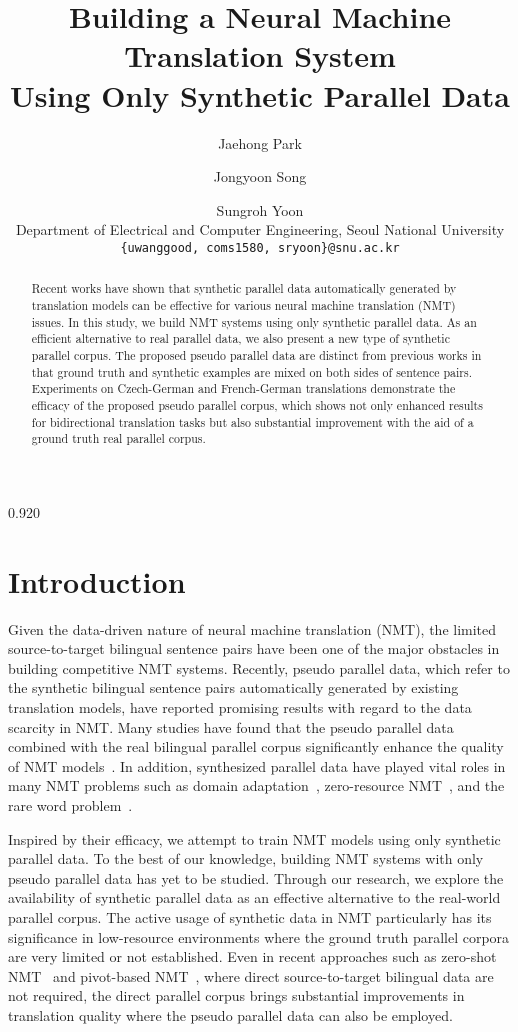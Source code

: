 \documentclass[11pt,letterpaper]{article}
\title{Building a Neural Machine Translation System\\Using Only Synthetic Parallel Data}
\author{Jaehong Park \and Jongyoon Song \and Sungroh Yoon \\
Department of Electrical and Computer Engineering, Seoul National University \\
\texttt{\{uwanggood, coms1580, sryoon\}@snu.ac.kr}}
\date{}
\newcommand{\mylinespacing}{0.920}
\begin{document}
\maketitle

\begin{spacing}{\mylinespacing}
\begin{abstract}
Recent works have shown that synthetic parallel data automatically generated by translation models can be effective for various neural machine translation (NMT) issues. In this study, we build NMT systems using only synthetic parallel data. As an efficient alternative to real parallel data, we also present a new type of synthetic parallel corpus. The proposed pseudo parallel data are distinct from previous works in that ground truth and synthetic examples are mixed on both sides of sentence pairs. Experiments on Czech-German and French-German translations demonstrate the efficacy of the proposed pseudo parallel corpus, which shows not only enhanced results for bidirectional translation tasks but also substantial improvement with the aid of a ground truth real parallel corpus.
\end{abstract}


\section{Introduction}

Given the data-driven nature of neural machine translation (NMT), the limited source-to-target bilingual sentence pairs have been one of the major obstacles in building competitive NMT systems. Recently, pseudo parallel data, which refer to the synthetic bilingual sentence pairs automatically generated by existing translation models, have reported promising results with regard to the data scarcity in NMT. Many studies have found that the pseudo parallel data combined with the real bilingual parallel corpus significantly enhance the quality of NMT models~\cite{sennrich2015improving,zhang2016exploiting,cheng2016semi}. In addition, synthesized parallel data have played vital roles in many NMT problems such as domain adaptation~\cite{sennrich2015improving}, zero-resource NMT~\cite{firat2016zero}, and the rare word problem~\cite{zhang2016bridging}.

Inspired by their efficacy, we attempt to train NMT models using only synthetic parallel data. To the best of our knowledge, building NMT systems with only pseudo parallel data has yet to be studied. Through our research, we explore the availability of synthetic parallel data as an effective alternative to the real-world parallel corpus. The active usage of synthetic data in NMT particularly has its significance in low-resource environments where the ground truth parallel corpora are very limited or not established. Even in recent approaches such as zero-shot NMT~\cite{johnson2016google} and pivot-based NMT~\cite{cheng2016neural}, where direct source-to-target bilingual data are not required, the direct parallel corpus brings substantial improvements in translation quality where the pseudo parallel data can also be employed.


\end{spacing}
\end{document}
